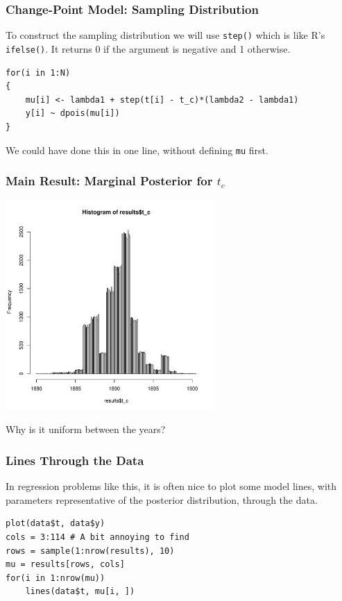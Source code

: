 \documentclass{beamer}
\begin{document}
\begin{frame}[fragile]
\frametitle{Change-Point Model: Sampling Distribution}
To construct the sampling distribution we will use \texttt{step()}
which is like R's \texttt{ifelse()}. It returns 0 if the argument is
negative and 1 otherwise.

\begin{verbatim}
for(i in 1:N)
{
    mu[i] <- lambda1 + step(t[i] - t_c)*(lambda2 - lambda1)
    y[i] ~ dpois(mu[i])
}
\end{verbatim}
\pause

We could have done this in one line, without defining \texttt{mu}
first.

\end{frame}

\begin{frame}
\frametitle{Main Result: Marginal Posterior for $t_c$}
\begin{center}
\includegraphics[width=0.6\textwidth]{images/coal_posterior.pdf} \\
\end{center}
Why is it uniform between the years?

\end{frame}


\begin{frame}[fragile]
\frametitle{Lines Through the Data}
In regression problems like this, it is often nice to plot
some model lines, with parameters representative of the
posterior distribution, through the data.
\begin{verbatim}
plot(data$t, data$y)
cols = 3:114 # A bit annoying to find
rows = sample(1:nrow(results), 10)
mu = results[rows, cols]
for(i in 1:nrow(mu))
    lines(data$t, mu[i, ])
\end{verbatim}

\end{frame}
\end{document}
